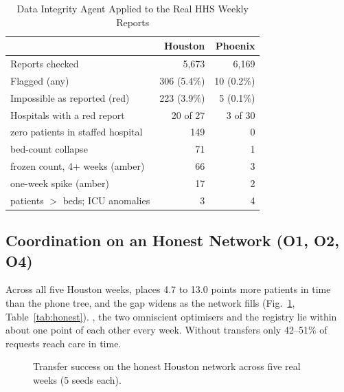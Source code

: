 \begin{table}[!t]
\centering
\caption{Data Integrity Agent Applied to the Real HHS Weekly Reports}
\label{tab:integrity}
\scriptsize
\setlength{\tabcolsep}{2pt}
\begin{tabular*}{\columnwidth}{@{\extracolsep{\fill}}lrr@{}}
\toprule
 & Houston & Phoenix \\
\midrule
Reports checked & 5,673 & 6,169 \\
Flagged (any) & 306 (5.4\%) & 10 (0.2\%) \\
Impossible as reported (red) & 223 (3.9\%) & 5 (0.1\%) \\
Hospitals with a red report & 20 of 27 & 3 of 30 \\
\quad zero patients in staffed hospital & 149 & 0 \\
\quad bed-count collapse & 71 & 1 \\
\quad frozen count, 4+ weeks (amber) & 66 & 3 \\
\quad one-week spike (amber) & 17 & 2 \\
\quad patients $>$ beds; ICU anomalies & 3 & 4 \\
\bottomrule
\end{tabular*}
\end{table}

\subsection{Coordination on an Honest Network (O1, O2, O4)}
\label{sec:res-honest}
Across all five Houston weeks, \mahros{} places 4.7 to 13.0 points more patients in time than the phone tree, and the gap widens as the network fills (Fig.~\ref{fig:honest}, Table~\ref{tab:honest}). \mahros{}, the two omniscient optimisers and the registry lie within about one point of each other every week. Without transfers only 42--51\% of requests reach care in time.

\begin{figure}[!t]
\centering
{}
\caption{Transfer success on the honest Houston network across five real weeks (5 seeds each).}
\label{fig:honest}
\end{figure}

